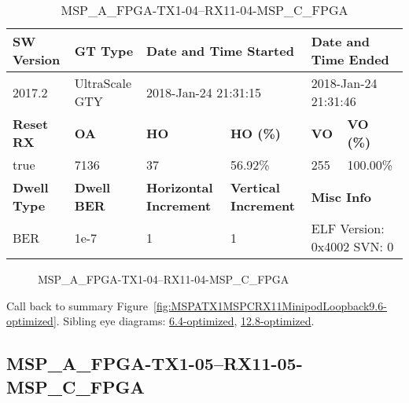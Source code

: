 \begin{table}[h]
\centering
\caption{MSP\_A\_FPGA-TX1-04--RX11-04-MSP\_C\_FPGA}
\label{tab:MSPAFPGATX104RX1104MSPCFPGA9.6-optimized}
\begin{tabular}{@{}|l|l|l|l|l|l|@{}}
\toprule
\textbf{SW Version}                & \textbf{GT Type}   & \multicolumn{2}{l|}{\textbf{Date and Time Started}}            & \multicolumn{2}{l|}{\textbf{Date and Time Ended}}        \\ \midrule
2017.2                       & UltraScale GTY          & \multicolumn{2}{l|}{2018-Jan-24 21:31:15}                   & \multicolumn{2}{l|}{2018-Jan-24 21:31:46}               \\ \midrule
\textbf{Reset RX}                  & \textbf{OA} & \textbf{HO}   & \textbf{HO (\%)} & \textbf{VO} & \textbf{VO (\%)} \\ \midrule
true & 7136        & 37          & 56.92\%        & 255        & 100.00\%       \\ \midrule
\textbf{Dwell Type}                & \textbf{Dwell BER} & \textbf{Horizontal Increment} & \textbf{Vertical Increment}    & \multicolumn{2}{l|}{\textbf{Misc Info}}                  \\ \midrule
BER                            & 1e-7        & 1        & 1           & \multicolumn{2}{l|}{ELF Version: 0x4002 SVN: 0}                         \\ \bottomrule
\end{tabular}
\end{table}

\begin{figure}[h]
\caption{MSP\_A\_FPGA-TX1-04--RX11-04-MSP\_C\_FPGA} \label{fig:MSPAFPGATX104RX1104MSPCFPGA9.6-optimized}
\end{figure}

Call back to summary Figure~\ref{fig:MSPATX1MSPCRX11MinipodLoopback9.6-optimized}.
Sibling eye diagrams: \hyperref[sec:MSPAFPGATX104RX1104MSPCFPGA6.4-optimized]{6.4-optimized}, \hyperref[sec:MSPAFPGATX104RX1104MSPCFPGA12.8-optimized]{12.8-optimized}.

\clearpage
\newpage


\subsection{MSP\_A\_FPGA-TX1-05--RX11-05-MSP\_C\_FPGA}\label{sec:MSPAFPGATX105RX1105MSPCFPGA9.6-optimized}

